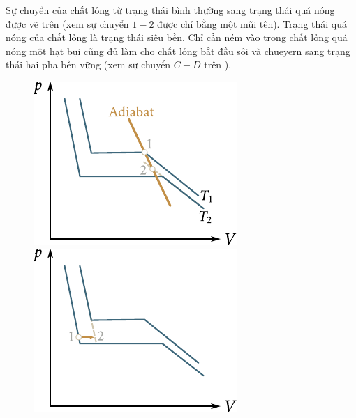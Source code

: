 Sự chuyển của chất lỏng từ trạng thái bình thường sang trạng thái quá nóng được vẽ trên  (xem sự chuyển $1-2$ được chỉ bằng một mũi tên). Trạng thái quá nóng của chất lỏng là trạng thái siêu bền. Chỉ cần ném vào trong chất lỏng quá nóng một hạt bụi cũng đủ làm cho chất lỏng bắt đầu sôi và chueyern sang trạng thái hai pha bền vững (xem sự chuyển $C-D$ trên ).

\begin{figure}[!htb]
	\begin{minipage}[t]{0.5\linewidth}
		\begin{center}
			\includegraphics[scale=1]{figures/ch_15/fig_15_11.pdf}
			\caption[]{}
			\label{fig:15_11}
		\end{center}
	\end{minipage}
	\hspace{-0.05cm}
	\begin{minipage}[t]{0.5\linewidth}
		\begin{center}
			\includegraphics[scale=1]{figures/ch_15/fig_15_12.pdf}
			\caption[]{}
			\label{fig:15_12}
		\end{center}
	\end{minipage}
	\vspace{-0.4cm}
\end{figure}

